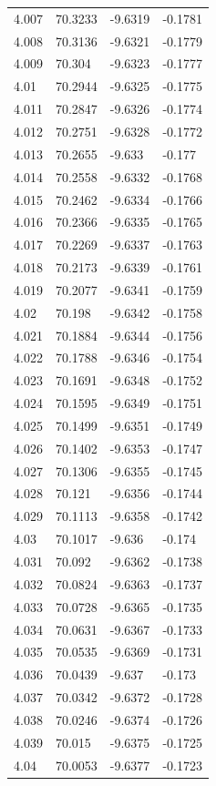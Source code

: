 \begin{tabular}{llll}
4.007 & 70.3233 & -9.6319 & -0.1781 \\
4.008 & 70.3136 & -9.6321 & -0.1779 \\
4.009 & 70.304 & -9.6323 & -0.1777 \\
4.01 & 70.2944 & -9.6325 & -0.1775 \\
4.011 & 70.2847 & -9.6326 & -0.1774 \\
4.012 & 70.2751 & -9.6328 & -0.1772 \\
4.013 & 70.2655 & -9.633 & -0.177 \\
4.014 & 70.2558 & -9.6332 & -0.1768 \\
4.015 & 70.2462 & -9.6334 & -0.1766 \\
4.016 & 70.2366 & -9.6335 & -0.1765 \\
4.017 & 70.2269 & -9.6337 & -0.1763 \\
4.018 & 70.2173 & -9.6339 & -0.1761 \\
4.019 & 70.2077 & -9.6341 & -0.1759 \\
4.02 & 70.198 & -9.6342 & -0.1758 \\
4.021 & 70.1884 & -9.6344 & -0.1756 \\
4.022 & 70.1788 & -9.6346 & -0.1754 \\
4.023 & 70.1691 & -9.6348 & -0.1752 \\
4.024 & 70.1595 & -9.6349 & -0.1751 \\
4.025 & 70.1499 & -9.6351 & -0.1749 \\
4.026 & 70.1402 & -9.6353 & -0.1747 \\
4.027 & 70.1306 & -9.6355 & -0.1745 \\
4.028 & 70.121 & -9.6356 & -0.1744 \\
4.029 & 70.1113 & -9.6358 & -0.1742 \\
4.03 & 70.1017 & -9.636 & -0.174 \\
4.031 & 70.092 & -9.6362 & -0.1738 \\
4.032 & 70.0824 & -9.6363 & -0.1737 \\
4.033 & 70.0728 & -9.6365 & -0.1735 \\
4.034 & 70.0631 & -9.6367 & -0.1733 \\
4.035 & 70.0535 & -9.6369 & -0.1731 \\
4.036 & 70.0439 & -9.637 & -0.173 \\
4.037 & 70.0342 & -9.6372 & -0.1728 \\
4.038 & 70.0246 & -9.6374 & -0.1726 \\
4.039 & 70.015 & -9.6375 & -0.1725 \\
4.04 & 70.0053 & -9.6377 & -0.1723 \\

\end{tabular}
